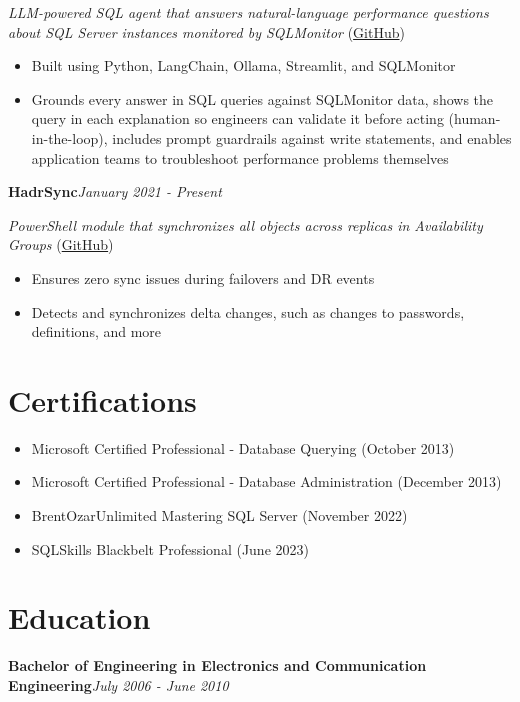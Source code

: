 \documentclass[10pt,a4paper]{article}
\begin{document}
\textit{LLM-powered SQL agent that answers natural-language performance questions about SQL Server instances monitored by SQLMonitor} (\href{https://github.com/imajaydwivedi/SQLMonitor/tree/dev/AI-Agent}{GitHub})
\begin{itemize}
  \item Built using Python, LangChain, Ollama, Streamlit, and SQLMonitor
  \item Grounds every answer in SQL queries against SQLMonitor data, shows the query in each explanation so engineers can validate it before acting (human-in-the-loop), includes prompt guardrails against write statements, and enables application teams to troubleshoot performance problems themselves
\end{itemize}
\vspace{14.7pt}
\noindent\textbf{HadrSync}\hfill \textit{January 2021 - Present}

\textit{PowerShell module that synchronizes all objects across replicas in Availability Groups} (\href{https://github.com/imajaydwivedi/HadrSync}{GitHub})
\begin{itemize}
  \item Ensures zero sync issues during failovers and DR events
  \item Detects and synchronizes delta changes, such as changes to passwords, definitions, and more
\end{itemize}

\section{Certifications}
\begin{itemize}
  \item Microsoft Certified Professional - Database Querying (October 2013)
  \item Microsoft Certified Professional - Database Administration (December 2013)
  \item BrentOzarUnlimited Mastering SQL Server (November 2022)
  \item SQLSkills Blackbelt Professional (June 2023)
\end{itemize}

\section{Education}
\noindent\textbf{Bachelor of Engineering in Electronics and Communication Engineering}\hfill \textit{July 2006 - June 2010}
\end{document}
